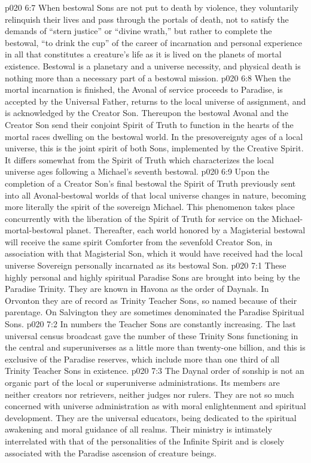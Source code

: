 \vs p020 6:7 When bestowal Sons are not put to death by violence, they voluntarily relinquish their lives and pass through the portals of death, not to satisfy the demands of “stern justice” or “divine wrath,” but rather to complete the bestowal, “to drink the cup” of the career of incarnation and personal experience in all that constitutes a creature’s life as it is lived on the planets of mortal existence. Bestowal is a planetary and a universe necessity, and physical death is nothing more than a necessary part of a bestowal mission.
\vs p020 6:8 When the mortal incarnation is finished, the Avonal of service proceeds to Paradise, is accepted by the Universal Father, returns to the local universe of assignment, and is acknowledged by the Creator Son. Thereupon the bestowal Avonal and the Creator Son send their conjoint Spirit of Truth to function in the hearts of the mortal races dwelling on the bestowal world. In the presovereignty ages of a local universe, this is the joint spirit of both Sons, implemented by the Creative Spirit. It differs somewhat from the Spirit of Truth which characterizes the local universe ages following a Michael’s seventh bestowal.
\vs p020 6:9 Upon the completion of a Creator Son’s final bestowal the Spirit of Truth previously sent into all Avonal\hyp{}bestowal worlds of that local universe changes in nature, becoming more literally the spirit of the sovereign Michael. This phenomenon takes place concurrently with the liberation of the Spirit of Truth for service on the Michael\hyp{}mortal\hyp{}bestowal planet. Thereafter, each world honored by a Magisterial bestowal will receive the same spirit Comforter from the sevenfold Creator Son, in association with that Magisterial Son, which it would have received had the local universe Sovereign personally incarnated as its bestowal Son.
\vs p020 7:1 These highly personal and highly spiritual Paradise Sons are brought into being by the Paradise Trinity. They are known in Havona as the order of Daynals. In Orvonton they are of record as Trinity Teacher Sons, so named because of their parentage. On Salvington they are sometimes denominated the Paradise Spiritual Sons.
\vs p020 7:2 In numbers the Teacher Sons are constantly increasing. The last universal census broadcast gave the number of these Trinity Sons functioning in the central and superuniverses as a little more than twenty\hyp{}one billion, and this is exclusive of the Paradise reserves, which include more than one third of all Trinity Teacher Sons in existence.
\vs p020 7:3 The Daynal order of sonship is not an organic part of the local or superuniverse administrations. Its members are neither creators nor retrievers, neither judges nor rulers. They are not so much concerned with universe administration as with moral enlightenment and spiritual development. They are the universal educators, being dedicated to the spiritual awakening and moral guidance of all realms. Their ministry is intimately interrelated with that of the personalities of the Infinite Spirit and is closely associated with the Paradise ascension of creature beings.\plusone
